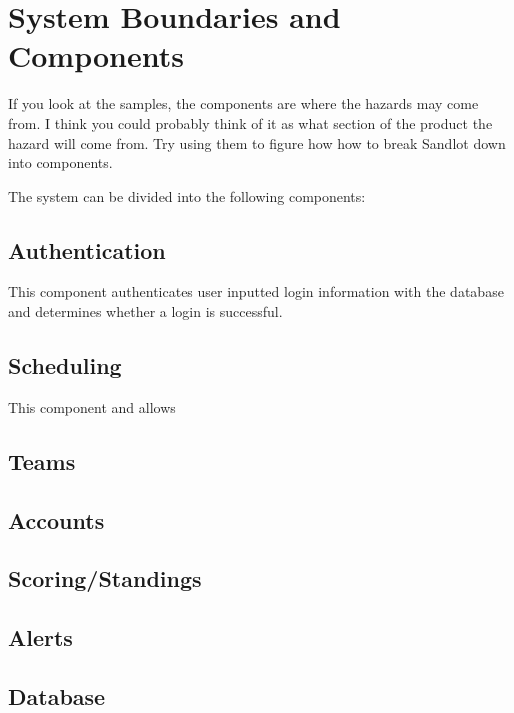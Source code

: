 \documentclass{article}
\begin{document}
\section{System Boundaries and Components}


If you look at the samples, the components are where the hazards may come from.
I think you could probably think of it as what section of the product the hazard will come from.
Try using them to figure how how to break Sandlot down into components.

The system can be divided into the following components:
\subsection{Authentication}
This component authenticates user inputted login information with the database
and determines whether a login is successful.
\subsection{Scheduling}
This component
and allows 
\subsection{Teams}

\subsection{Accounts}

\subsection{Scoring/Standings}

\subsection{Alerts}

\subsection{Database}
\end{document}
